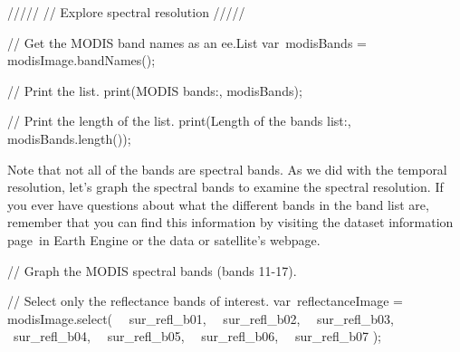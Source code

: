\documentclass[
  letterpaper,
  DIV=11,
  numbers=noendperiod]{scrreprt}
\newenvironment{Shaded}{\begin{snugshade}}{\end{snugshade}}
\newcommand{\CommentTok}[1]{\textcolor[rgb]{0.37,0.37,0.37}{#1}}
\newcommand{\FunctionTok}[1]{\textcolor[rgb]{0.28,0.35,0.67}{#1}}
\newcommand{\NormalTok}[1]{\textcolor[rgb]{0.00,0.23,0.31}{#1}}
\newcommand{\OperatorTok}[1]{\textcolor[rgb]{0.37,0.37,0.37}{#1}}
\newcommand{\StringTok}[1]{\textcolor[rgb]{0.13,0.47,0.30}{#1}}
\begin{document}
\begin{Shaded}
\begin{Highlighting}[]
\CommentTok{/////  }
\CommentTok{// Explore spectral resolution  }
\CommentTok{/////  }
  
\CommentTok{// Get the MODIS band names as an ee.List  }
\NormalTok{var modisBands }\OperatorTok{=}\NormalTok{ modisImage}\OperatorTok{.}\FunctionTok{bandNames}\NormalTok{()}\OperatorTok{;}  
  
\CommentTok{// Print the list.  }
\FunctionTok{print}\NormalTok{(}\StringTok{\textquotesingle{}MODIS bands:\textquotesingle{}}\OperatorTok{,}\NormalTok{ modisBands)}\OperatorTok{;}  
  
\CommentTok{// Print the length of the list.  }
\FunctionTok{print}\NormalTok{(}\StringTok{\textquotesingle{}Length of the bands list:\textquotesingle{}}\OperatorTok{,}\NormalTok{ modisBands}\OperatorTok{.}\FunctionTok{length}\NormalTok{())}\OperatorTok{;}
\end{Highlighting}
\end{Shaded}

Note that not all of the bands are spectral bands. As we did with the
temporal resolution, let's graph the spectral bands to examine the
spectral resolution. If you ever have questions about what the different
bands in the band list are, remember that you can find this information
by visiting the dataset information page~in Earth Engine or the data or
satellite's webpage.

\begin{Shaded}
\begin{Highlighting}[]
\CommentTok{// Graph the MODIS spectral bands (bands 11{-}17).  }
  
\CommentTok{// Select only the reflectance bands of interest.  }
\NormalTok{var reflectanceImage }\OperatorTok{=}\NormalTok{ modisImage}\OperatorTok{.}\FunctionTok{select}\NormalTok{(   }\StringTok{\textquotesingle{}sur\_refl\_b01\textquotesingle{}}\OperatorTok{,}   \StringTok{\textquotesingle{}sur\_refl\_b02\textquotesingle{}}\OperatorTok{,}   \StringTok{\textquotesingle{}sur\_refl\_b03\textquotesingle{}}\OperatorTok{,}   \StringTok{\textquotesingle{}sur\_refl\_b04\textquotesingle{}}\OperatorTok{,}   \StringTok{\textquotesingle{}sur\_refl\_b05\textquotesingle{}}\OperatorTok{,}   \StringTok{\textquotesingle{}sur\_refl\_b06\textquotesingle{}}\OperatorTok{,}   \StringTok{\textquotesingle{}sur\_refl\_b07\textquotesingle{}}  
\NormalTok{)}\OperatorTok{;}
\end{Highlighting}
\end{Shaded}
\end{document}
